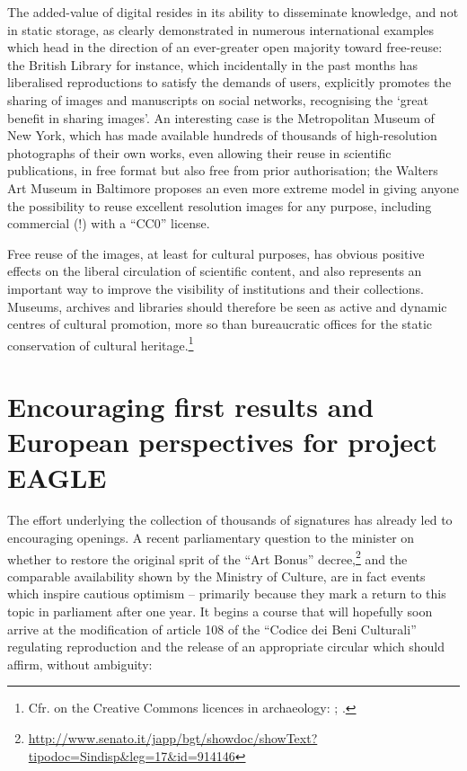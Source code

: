 \documentclass[amsthm,ebook]{saparticle}
\begin{document}
The added-value of digital resides in its ability to disseminate knowledge, and not in static storage, as clearly
demonstrated in numerous international examples which head in the direction of an ever-greater open majority toward
free-reuse: the British Library for instance, which incidentally in the past months has liberalised reproductions to
satisfy the demands of users, explicitly promotes the sharing of images and manuscripts on social networks, recognising
the `great benefit in sharing images’. An interesting case is the Metropolitan Museum of New York, which has made
available hundreds of thousands of high-resolution photographs of their own works, even allowing their reuse in
scientific publications, in free format but also free from prior authorisation; the Walters Art Museum in Baltimore
proposes an even more extreme model in giving anyone the possibility to reuse excellent resolution images for any
purpose, including commercial (!) with a ``CC0'' license.

Free reuse of the images, at least for cultural purposes, has obvious positive effects on the liberal circulation of
scientific content, and also represents an important way to improve the visibility of institutions and their
collections. Museums, archives and libraries should therefore be seen as active and dynamic centres of cultural
promotion, more so than bureaucratic offices for the static conservation of cultural heritage.\footnote{Cfr. on the
Creative Commons licences in archaeology: \citet{brugnoli_fotografia_2013}; \citet{gualandi}.}




\section{Encouraging first results and European perspectives for project EAGLE}



The effort underlying the collection of thousands of signatures has already led to encouraging openings. A recent
parliamentary question to the minister on whether to restore the original sprit of the ``Art Bonus''
decree,\footnote{\url{http://www.senato.it/japp/bgt/showdoc/showText?tipodoc=Sindisp\&leg=17\&id=914146}} and the
comparable availability shown by the Ministry of Culture, are in fact events which inspire cautious optimism –
primarily because they mark a return to this topic in parliament after one year. It begins a course that will hopefully
soon arrive at the modification of article 108 of the ``Codice dei Beni Culturali'' regulating reproduction and the
release of an appropriate circular which should affirm, without ambiguity:
\end{document}
